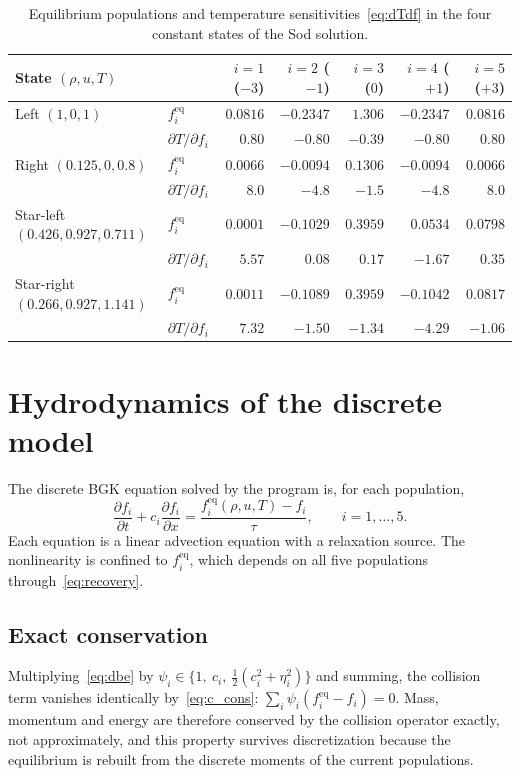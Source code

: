 \documentclass[11pt]{article}
\theoremstyle{remark}
\newcommand{\feq}{f^{\mathrm{eq}}}
\newcommand{\pd}[2]{\frac{\partial #1}{\partial #2}}
\begin{document}
\begin{table}[ht]
\centering
\caption{Equilibrium populations and temperature sensitivities~\eqref{eq:dTdf} in the
four constant states of the Sod solution.}
\label{tab:sensitivity}
\small
\begin{tabular}{@{}llrrrrr@{}}
\toprule
State $(\rho,u,T)$ & & $i=1$ ($-3$) & $i=2$ ($-1$) & $i=3$ ($0$) & $i=4$ ($+1$) & $i=5$ ($+3$)\\
\midrule
Left $(1,0,1)$ & $\feq_i$ & $0.0816$ & $-0.2347$ & $1.306$ & $-0.2347$ & $0.0816$ \\
 & $\partial T/\partial f_i$ & $0.80$ & $-0.80$ & $-0.39$ & $-0.80$ & $0.80$ \\[2pt]
Right $(0.125,0,0.8)$ & $\feq_i$ & $0.0066$ & $-0.0094$ & $0.1306$ & $-0.0094$ & $0.0066$ \\
 & $\partial T/\partial f_i$ & $8.0$ & $-4.8$ & $-1.5$ & $-4.8$ & $8.0$ \\[2pt]
Star-left $(0.426,0.927,0.711)$ & $\feq_i$ & $0.0001$ & $-0.1029$ & $0.3959$ & $0.0534$ & $0.0798$ \\
 & $\partial T/\partial f_i$ & $5.57$ & $0.08$ & $0.17$ & $-1.67$ & $0.35$ \\[2pt]
Star-right $(0.266,0.927,1.141)$ & $\feq_i$ & $0.0011$ & $-0.1089$ & $0.3959$ & $-0.1042$ & $0.0817$ \\
 & $\partial T/\partial f_i$ & $7.32$ & $-1.50$ & $-1.34$ & $-4.29$ & $-1.06$ \\
\bottomrule
\end{tabular}
\end{table}

\section{Hydrodynamics of the discrete model}
\label{sec:ce_discrete}

The discrete BGK equation solved by the program is, for each population,
\begin{equation}
  \pd{f_i}{t} + c_i\pd{f_i}{x} = \frac{\feq_i(\rho,u,T) - f_i}{\tau},
  \qquad i = 1,\dots,5 .
  \label{eq:dbe}
\end{equation}
Each equation is a linear advection equation with a relaxation source.  The
nonlinearity is confined to $\feq_i$, which depends on all five populations
through~\eqref{eq:recovery}.

\subsection{Exact conservation}
\label{sec:conservation}
Multiplying~\eqref{eq:dbe} by $\psi_i \in \{1,\ c_i,\ \tfrac12(c_i^2+\eta_i^2)\}$ and
summing, the collision term vanishes identically by~\eqref{eq:c_cons}:
$\sum_i\psi_i(\feq_i - f_i) = 0$.  Mass, momentum and energy are therefore
conserved by the collision operator exactly, not approximately, and this property
survives discretization because the equilibrium is rebuilt from the discrete
moments of the current populations.
\end{document}
